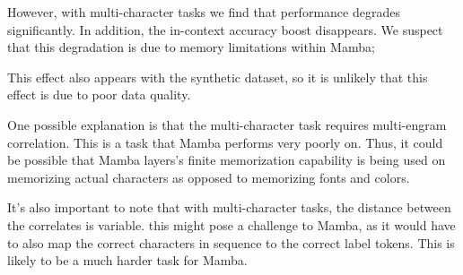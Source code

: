 However, with multi-character tasks we find that performance degrades
significantly. In addition, the in-context accuracy boost disappears.
We suspect that this degradation is due to memory limitations within Mamba;

This effect also appears with the synthetic dataset, so it is unlikely that this
effect is due to poor data quality.

One possible explanation is that the multi-character task requires multi-engram
correlation.
This is a task that Mamba performs very poorly on\cite{mambangram}.
Thus, it could be possible that Mamba layers's finite memorization capability
is being used on memorizing actual characters as opposed to memorizing fonts
and colors.

It's also important to note that with multi-character tasks, the distance
between the correlates is variable.
this might pose a challenge to Mamba, as it would have to also map the correct
characters in sequence to the correct label tokens.
This is likely to be a much harder task for Mamba.

